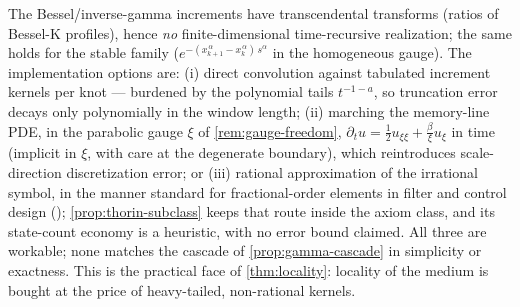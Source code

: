 \begin{remark}\label{rem:local-implementation}
The Bessel/inverse-gamma increments have transcendental transforms (ratios of Bessel-K
profiles), hence \emph{no} finite-dimensional time-recursive realization; the same holds for
the stable family ($e^{-(x_{k+1}^{\,\alpha} - x_k^{\,\alpha})\,s^\alpha}$ in the homogeneous
gauge). The implementation options are: (i) direct convolution against tabulated increment
kernels per knot --- burdened by the polynomial tails $t^{-1-a}$, so truncation error decays
only polynomially in the window length; (ii) marching the memory-line PDE, in the parabolic
gauge $\xi$ of \ref{rem:gauge-freedom},
$\partial_t u = \tfrac12 u_{\xi\xi} + \tfrac{\beta}{\xi}u_\xi$ in time (implicit in $\xi$, with
care at the degenerate boundary), which reintroduces scale-direction discretization error; or
(iii) rational approximation of the irrational symbol, in the manner standard for
fractional-order elements in filter and control design ();
\ref{prop:thorin-subclass} keeps that route inside the axiom class, and its state-count
economy is a heuristic, with no error bound claimed. All three are workable; none matches
the cascade of \ref{prop:gamma-cascade} in simplicity or exactness. This is the practical
face of \ref{thm:locality}: locality of the medium is bought at the price of heavy-tailed,
non-rational kernels.
\end{remark}

